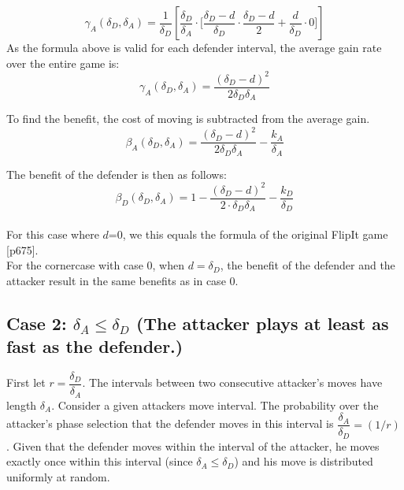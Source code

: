 \begin{equation*}
\gamma_{A}(\delta_{D},\delta_{A}) = \dfrac {1}{\delta_{D}} [ \dfrac{\delta_{D}}{\delta_{A}} \cdot \big[ \dfrac{\delta_{D}-d}{\delta_{D}} \cdot \dfrac{\delta_{D}-d}{2} + \dfrac{d}{\delta_{D}} \cdot 0 \big] ]
\end{equation*}
As the formula above is valid for each defender interval, the average gain rate over the entire game is:
\begin{equation*}
\gamma_{A}(\delta_{D},\delta_{A}) = \dfrac{(\delta_{D} -d)^{2}}{2\delta_{D}\delta_{A}}
\end{equation*}

To find the benefit, the cost of moving is subtracted from the average gain. 
\begin{equation}
\beta_{A}(\delta_{D},\delta_{A}) = \dfrac { (\delta_{D}-d) ^{2}} {2 \delta_{D}  \delta_{A}} - \dfrac{k_{A}}{\delta_{A}}
\label{Benfcase1:attacker}
\end{equation}

 
 The benefit of the defender is then as follows:
\begin{equation}
\beta_{D}(\delta_{D},\delta_{A}) = 1 - \dfrac { (\delta_{D}-d) ^{2}} {2 \cdot \delta_{D}  \delta_{A}} - \dfrac{k_{D}}{ \delta_{D}}
\label{Benfcase1:defender}
\end{equation}
~~\\
For this case where $d$=0, we this equals the formula of the original FlipIt game \citep{FlipIt} [p675].\\
For the cornercase with case 0, when $d=\delta_{D}$, the benefit of the defender and the attacker result in the same benefits as in case 0.




\subsection*{\textbf{Case 2:} $\delta_{A} \leq \delta_{D} $ (The attacker plays at least as fast as the defender.) }

First let $r = \dfrac{\delta_{D}}{ \delta_{A} }$. The intervals between two consecutive attacker's moves have length $\delta_{A}$. Consider a given attackers move interval. The probability over the attacker's phase selection that the defender moves in this interval is $\dfrac{\delta_{A}}{ \delta_{D} } = (1/r)$. Given that the defender moves within the interval of the attacker, he moves exactly once within this interval (since $\delta_{A} \leq \delta_{D} $) and his move is distributed uniformly at random. \\

